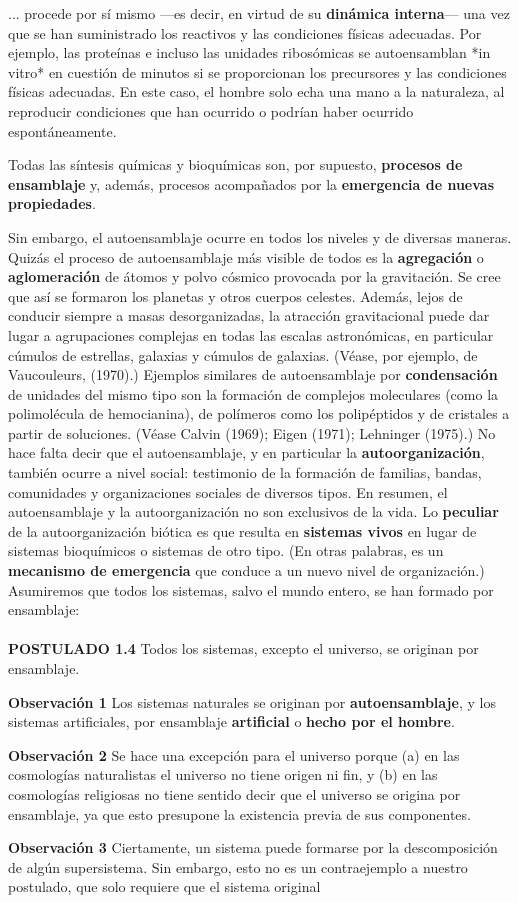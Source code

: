 {\fontsize{13}{15}\selectfont
... procede por sí mismo —es decir, en virtud de su \textbf{dinámica interna}— una vez que se han suministrado los reactivos y las condiciones físicas adecuadas. Por ejemplo, las proteínas e incluso las unidades ribosómicas se autoensamblan *in vitro* en cuestión de minutos si se proporcionan los precursores y las condiciones físicas adecuadas. En este caso, el hombre solo echa una mano a la naturaleza, al reproducir condiciones que han ocurrido o podrían haber ocurrido espontáneamente.

Todas las síntesis químicas y bioquímicas son, por supuesto, \textbf{procesos de ensamblaje} y, además, procesos acompañados por la \textbf{emergencia de nuevas propiedades}.

Sin embargo, el autoensamblaje ocurre en todos los niveles y de diversas maneras. Quizás el proceso de autoensamblaje más visible de todos es la \textbf{agregación} o \textbf{aglomeración} de átomos y polvo cósmico provocada por la gravitación. Se cree que así se formaron los planetas y otros cuerpos celestes. Además, lejos de conducir siempre a masas desorganizadas, la atracción gravitacional puede dar lugar a agrupaciones complejas en todas las escalas astronómicas, en particular cúmulos de estrellas, galaxias y cúmulos de galaxias. (Véase, por ejemplo, de Vaucouleurs, (1970).) Ejemplos similares de autoensamblaje por \textbf{condensación} de unidades del mismo tipo son la formación de complejos moleculares (como la polimolécula de hemocianina), de polímeros como los polipéptidos y de cristales a partir de soluciones. (Véase Calvin (1969); Eigen (1971); Lehninger (1975).) No hace falta decir que el autoensamblaje, y en particular la \textbf{autoorganización}, también ocurre a nivel social: testimonio de la formación de familias, bandas, comunidades y organizaciones sociales de diversos tipos. En resumen, el autoensamblaje y la autoorganización no son exclusivos de la vida. Lo \textbf{peculiar} de la autoorganización biótica es que resulta en \textbf{sistemas vivos} en lugar de sistemas bioquímicos o sistemas de otro tipo. (En otras palabras, es un \textbf{mecanismo de emergencia} que conduce a un nuevo nivel de organización.) Asumiremos que todos los sistemas, salvo el mundo entero, se han formado por ensamblaje:
\\\\
\textbf{POSTULADO 1.4} Todos los sistemas, excepto el universo, se originan por ensamblaje.

\textbf{Observación 1} Los sistemas naturales se originan por \textbf{autoensamblaje}, y los sistemas artificiales, por ensamblaje \textbf{artificial} o \textbf{hecho por el hombre}.

\textbf{Observación 2} Se hace una excepción para el universo porque (a) en las cosmologías naturalistas el universo no tiene origen ni fin, y (b) en las cosmologías religiosas no tiene sentido decir que el universo se origina por ensamblaje, ya que esto presupone la existencia previa de sus componentes.

\textbf{Observación 3} Ciertamente, un sistema puede formarse por la descomposición de algún supersistema. Sin embargo, esto no es un contraejemplo a nuestro postulado, que solo requiere que el sistema original
}
